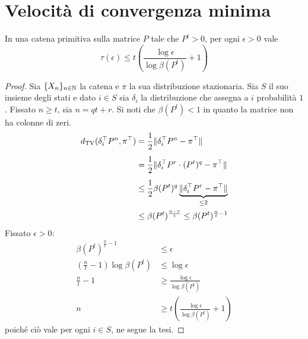 \section{Velocità di convergenza minima}
\begin{thm}
	In una catena primitiva sulla matrice $P$ tale che $P^t>0$, per ogni $\epsilon>0$ vale
	\begin{equation*}
		\tau(\epsilon)\le t\left(\frac{\log\epsilon}{\log\beta(P^t)}+1\right)
	\end{equation*}
\end{thm}
\begin{proof}
	Sia $\{X_n\}_{n\in\mathbb N}$ la catena e $\pi$ la sua distribuzione stazionaria. Sia $S$ il suo insieme degli stati e dato $i\in S$ sia $\delta_i$ la distribuzione che assegna a $i$ probabilità $1$. Fissato $n\ge t$, sia $n=qt+r$. Si noti che $\beta(P^t)<1$ in quanto la matrice non ha colonne di zeri.
	\begin{align*}
		d_{\mathrm{TV}}(\delta_i^\top P^n,\pi^\top) & = \frac12\|\delta_i^\top P^n-\pi^\top\|                                   \\[1ex]
		                               & = \frac12\|\delta_i^\top P^r\cdot (P^t)^q-\pi^\top\|                      \\[1ex]
		                               & \le \frac12\beta(P^t)^q\underbrace{\|\delta_i^\top P^r-\pi^\top\|}_{\le2} \\
		                               & \le \beta(P^t)^{\frac{n-r}{t}} \le \beta(P^t)^{\frac n t -1}
	\end{align*}
	Fissato $\epsilon>0$:
	\begin{align*}
		\beta(P^t)^{\frac n t -1}             & \le \epsilon                                            \\
		\left(\frac nt-1\right)\log\beta(P^t) & \le \log\epsilon                                        \\
		\frac nt-1                            & \ge \frac{\log\epsilon}{\log\beta(P^t)}                 \\
		n                                     & \ge t\left(\frac{\log\epsilon}{\log\beta(P^t)}+1\right)
	\end{align*}
	poiché ciò vale per ogni $i\in S$, ne segue la tesi.
\end{proof}
